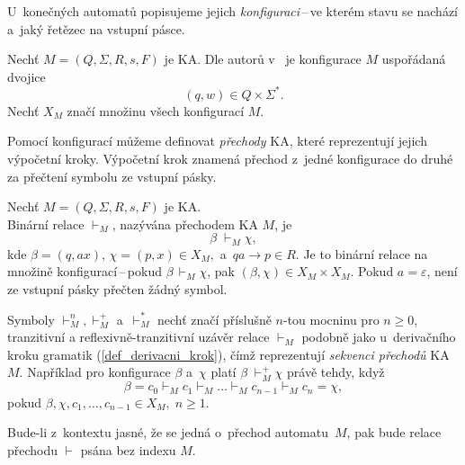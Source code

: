 U~konečných automatů popisujeme jejich \emph{konfiguraci}\,--\,ve kterém stavu se nachází a~jaký řetězec na vstupní pásce.
\begin{definition}\label{def_konfigurace_ka}
    Nechť $M = (Q, \Sigma, R, s, F)$ je KA. Dle autorů v~\cite{TIN-opora} je konfigurace $M$ uspořádaná dvojice
    \begin{equation*}
        (q, w) \in Q \times \Sigma^*.
    \end{equation*} 
    Nechť $X_M$ značí množinu všech konfigurací $M$.
\end{definition}

Pomocí konfigurací můžeme definovat \emph{přechody} KA, které reprezentují jejich výpočetní kroky.
Výpočetní krok znamená přechod z~jedné konfigurace do druhé za přečtení symbolu ze vstupní pásky.
\begin{definition}\label{def_prechod_ka}
    Nechť $M = (Q, \Sigma, R, s, F)$ je KA.\\
    Binární relace $\vdash_{\scriptscriptstyle M}$, nazývána přechodem KA $M$, je
    \begin{equation*}
        \beta\; \vdash_{\scriptscriptstyle M}\chi,
    \end{equation*}
    kde $\beta = (q, ax),\, \chi = (p, x) \in X_M,$ a~$qa \rightarrow p \in R$.
    Je to binární relace na množině konfigurací\,--\,pokud $\beta\, \vdash_{\scriptscriptstyle M} \chi$, pak $(\beta, \chi) \in X_M \times X_M$.
    Pokud $a = \varepsilon$, není ze vstupní pásky přečten žádný symbol.
    
    Symboly $\vdash_{\scriptscriptstyle M}^n, \vdash_{\scriptscriptstyle M}^+$ a~$\vdash_{\scriptscriptstyle M}^*$ nechť značí příslušně $n$-tou mocninu pro $n \geq 0$, tranzitivní a reflexivně-tranzitivní uzávěr relace $\vdash_{\scriptscriptstyle M}$ podobně jako u~derivačního kroku gramatik (\ref{def_derivacni_krok}), čímž reprezentují \emph{sekvenci přechodů} KA $M$.
    Například pro konfigurace $\beta$ a~$\chi$ platí $\beta\; \vdash_{\scriptscriptstyle M}^+ \chi$ právě tehdy, když
    \begin{equation*}
        \beta = c_0 \vdash_{\scriptscriptstyle M} c_1 \vdash_{\scriptscriptstyle M} \ldots \vdash_{\scriptscriptstyle M} c_{n-1} \vdash_{\scriptscriptstyle M} c_{n} = \chi,
    \end{equation*}
    pokud $\beta, \chi, c_1, \ldots, c_{n-1} \in X_M,\; n \geq 1$.
\end{definition}

\begin{convention}
    Bude-li z~kontextu jasné, že se jedná o~přechod automatu~$M$, pak bude relace přechodu $\vdash$ psána bez indexu $M$.  
\end{convention}

